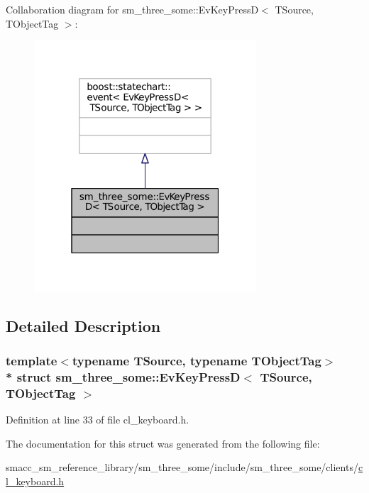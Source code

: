 Collaboration diagram for sm\+\_\+three\+\_\+some\+:\+:Ev\+Key\+PressD$<$ T\+Source, T\+Object\+Tag $>$\+:
\nopagebreak
\begin{figure}[H]
\begin{center}
\leavevmode
\includegraphics[width=235pt]{structsm__three__some_1_1EvKeyPressD__coll__graph}
\end{center}
\end{figure}


\subsection{Detailed Description}
\subsubsection*{template$<$typename T\+Source, typename T\+Object\+Tag$>$\\*
struct sm\+\_\+three\+\_\+some\+::\+Ev\+Key\+Press\+D$<$ T\+Source, T\+Object\+Tag $>$}



Definition at line 33 of file cl\+\_\+keyboard.\+h.



The documentation for this struct was generated from the following file\+:\begin{DoxyCompactItemize}
\item 
smacc\+\_\+sm\+\_\+reference\+\_\+library/sm\+\_\+three\+\_\+some/include/sm\+\_\+three\+\_\+some/clients/\hyperlink{cl__keyboard_8h}{cl\+\_\+keyboard.\+h}\end{DoxyCompactItemize}
